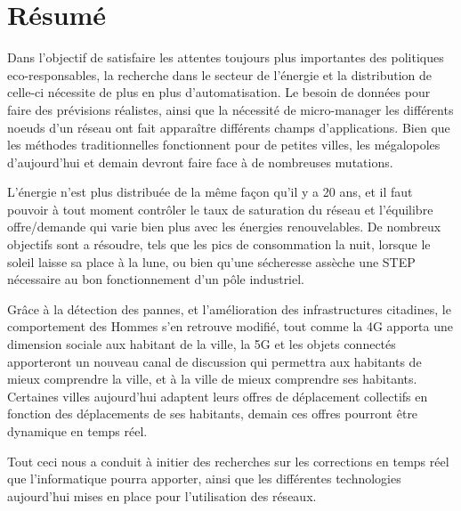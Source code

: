 \chapter*{Résumé}

Dans l'objectif de satisfaire les attentes toujours plus importantes des politiques eco-responsables,
la recherche dans le secteur de l'énergie et la distribution de celle-ci nécessite de plus en plus d'automatisation.
Le besoin de données pour faire des prévisions réalistes, ainsi que la nécessité de micro-manager les différents noeuds
d'un réseau ont fait apparaître différents champs d'applications. Bien que les méthodes traditionnelles fonctionnent
pour de petites villes, les mégalopoles d'aujourd’hui et demain devront faire face à de nombreuses mutations.

L'énergie n'est plus distribuée de la même façon qu'il y a 20 ans, et il faut pouvoir à tout moment contrôler
le taux de saturation du réseau et l'équilibre offre/demande qui varie bien plus avec les énergies renouvelables.
De nombreux objectifs sont a résoudre, tels que les pics de consommation la nuit, lorsque le soleil laisse sa place
à la lune, ou bien qu'une sécheresse assèche une STEP nécessaire au bon fonctionnement d'un pôle industriel.

Grâce à la détection des pannes, et l'amélioration des infrastructures citadines, le comportement des Hommes
s'en retrouve modifié, tout comme la 4G apporta une dimension sociale aux habitant de la ville, la 5G et les objets
connectés apporteront un nouveau canal de discussion qui permettra aux habitants de mieux comprendre la ville, et
à la ville de mieux comprendre ses habitants. Certaines villes aujourd’hui adaptent leurs offres de déplacement
collectifs en fonction des déplacements de ses habitants, demain ces offres pourront être dynamique en temps réel.

Tout ceci nous a conduit à initier des recherches sur les corrections en temps réel que l'informatique pourra
apporter, ainsi que les différentes technologies aujourd’hui mises en place pour l'utilisation des réseaux.